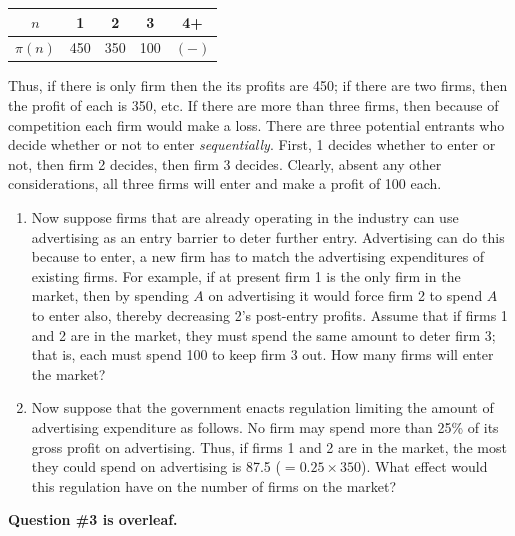 \documentclass[11pt]{article}
\begin{document}
\begin{enumerate}[leftmargin=*, label=\arabic*.]
    \begin{center}
    \begin{tabular}{|c|c|c|c|c|}
    \hline
    $n$ & 1 & 2 & 3 & 4+ \\ \hline
    $\pi(n)$ & 450 & 350 & 100 & $(-)$ \\ \hline
    \end{tabular}
    \end{center}
    
    Thus, if there is only firm then the its profits are 450; if there are two firms, then the profit of each is 350, etc. If there are more than three firms, then because of competition each firm would make a loss. There are three potential entrants who decide whether or not to enter \textit{sequentially}. First, 1 decides whether to enter or not, then firm 2 decides, then firm 3 decides. Clearly, absent any other considerations, all three firms will enter and make a profit of 100 each.
    
    \begin{enumerate}[label=(\alph*)]
        \item Now suppose firms that are already operating in the industry can use advertising as an entry barrier to deter further entry. Advertising can do this because to enter, a new firm has to match the advertising expenditures of existing firms. For example, if at present firm 1 is the only firm in the market, then by spending $A$ on advertising it would force firm 2 to spend $A$ to enter also, thereby decreasing 2's post-entry profits. Assume that if firms 1 and 2 are in the market, they must spend the same amount to deter firm 3; that is, each must spend 100 to keep firm 3 out. How many firms will enter the market?
        
        \item Now suppose that the government enacts regulation limiting the amount of advertising expenditure as follows. No firm may spend more than 25\% of its gross profit on advertising. Thus, if firms 1 and 2 are in the market, the most they could spend on advertising is 87.5 ($= 0.25 \times 350$). What effect would this regulation have on the number of firms on the market?
    \end{enumerate}
\end{enumerate}

\centerline{\textbf{Question \#3 is overleaf.}}
\end{document}

